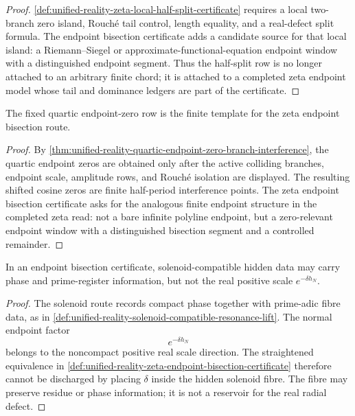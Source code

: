 \begin{proof}
\autoref{def:unified-reality-zeta-local-half-split-certificate} requires
a local two-branch zero island, Rouch\'e tail control, length equality,
and a real-defect split formula.  The endpoint bisection certificate
adds a candidate source for that local island: a Riemann--Siegel or
approximate-functional-equation endpoint window with a distinguished
endpoint segment.  Thus the half-split row is no longer attached to an
arbitrary finite chord; it is attached to a completed zeta endpoint
model whose tail and dominance ledgers are part of the certificate.
\end{proof}

\begin{corollary}
\label{cor:unified-reality-quartic-endpoint-row-finite-bisection-template}
The fixed quartic endpoint-zero row is the finite template for the zeta
endpoint bisection route.
\end{corollary}

\begin{proof}
By
\autoref{thm:unified-reality-quartic-endpoint-zero-branch-interference},
the quartic endpoint zeros are obtained only after the active colliding
branches, endpoint scale, amplitude rows, and Rouch\'e isolation are
displayed.  The resulting shifted cosine zeros are finite half-period
interference points.  The zeta endpoint bisection certificate asks for
the analogous finite endpoint structure in the completed zeta read: not
a bare infinite polyline endpoint, but a zero-relevant endpoint window
with a distinguished bisection segment and a controlled remainder.
\end{proof}

\begin{corollary}
\label{cor:unified-reality-endpoint-bisection-solenoid-no-real-scale}
In an endpoint bisection certificate, solenoid-compatible hidden data
may carry phase and prime-register information, but not the real
positive scale $e^{-\delta h_N}$.
\end{corollary}

\begin{proof}
The solenoid route records compact phase together with prime-adic fibre
data, as in
\autoref{def:unified-reality-solenoid-compatible-resonance-lift}.  The
normal endpoint factor
$$
e^{-\delta h_N}
$$
belongs to the noncompact positive real scale direction.  The
straightened equivalence in
\autoref{def:unified-reality-zeta-endpoint-bisection-certificate}
therefore cannot be discharged by placing $\delta$ inside the hidden
solenoid fibre.  The fibre may preserve residue or phase information;
it is not a reservoir for the real radial defect.
\end{proof}

